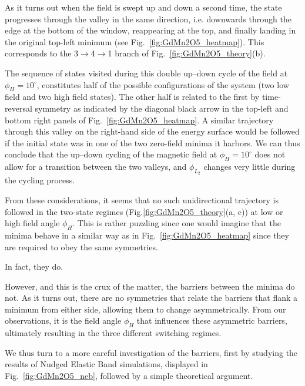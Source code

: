 As it turns out when the field is swept up and down a second time, the state progresses through the valley in the same direction, i.e. downwards through the edge at the bottom of the window, reappearing at the top, and finally landing in the original top-left minimum (see Fig.~\ref{fig:GdMn2O5_heatmap}).
This corresponds to the 3$\rightarrow$4$\rightarrow$1 branch of Fig.~\ref{fig:GdMn2O5_theory}(b).

The sequence of states visited during this double up--down cycle of the field at $\phi_H = 10^\circ$, constitutes half of the possible configurations of the system (two low field and two high field states).
The other half is related to the first by time-reversal symmetry as indicated by the diagonal black arrow in the top-left and bottom right panels of Fig.~\ref{fig:GdMn2O5_heatmap}.
A similar trajectory through this valley on the right-hand side of the energy surface would be followed if the initial state was in one of the two zero-field minima it harbors. 
We can thus conclude that the up--down cycling of the magnetic field at $\phi_H=10^\circ$ does not allow for a transition between the two valleys, and $\phi_{L_2}$ changes very little during the cycling process.

From these considerations, it seems that no such unidirectional trajectory is followed in the two-state regimes (Fig.\ref{fig:GdMn2O5_theory}(a, c)) at low or high field angle $\phi_H$.
This is rather puzzling since one would imagine that the minima behave in a similar way as in Fig.~\ref{fig:GdMn2O5_heatmap} since they are required to obey the same symmetries.

In fact, they do.

However, and this is the crux of the matter, the barriers between the minima do not. As it turns out, there are no symmetries that relate the barriers that flank a minimum from either side, allowing them to change asymmetrically.
From our observations, it is the field angle $\phi_H$ that influences these asymmetric barriers, ultimately resulting in the three different switching regimes.

We thus turn to a more careful investigation of the barriers, first by studying the results of Nudged Elastic Band simulations, displayed in Fig.~\ref{fig:GdMn2O5_neb}, followed by a simple theoretical argument.

